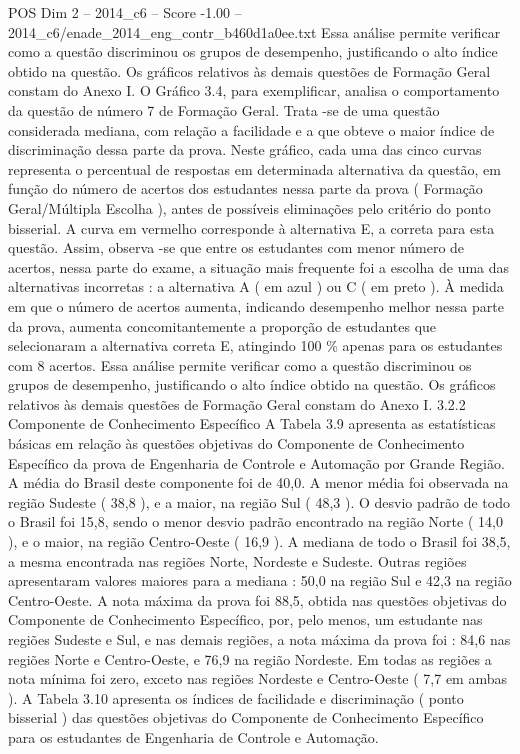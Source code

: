 \begin{textsample}{POS Dim 2 – 2014\_c6 – Score -1.00 – 2014\_c6/enade\_2014\_eng\_contr\_b460d1a0ee.txt}
Essa análise permite verificar como a questão discriminou os grupos de desempenho, justificando o alto índice obtido na questão.
Os gráficos relativos às demais questões de Formação Geral constam do Anexo I.
O Gráfico 3.4, para exemplificar, analisa o comportamento da questão de número 7 de Formação Geral.
Trata -se de uma questão considerada mediana, com relação a facilidade e a que obteve o maior índice de discriminação dessa parte da prova.
Neste gráfico, cada uma das cinco curvas representa o percentual de respostas em determinada alternativa da questão, em função do número de acertos dos estudantes nessa parte da prova ( Formação Geral/Múltipla Escolha ), antes de possíveis eliminações pelo critério do ponto bisserial.
A curva em vermelho corresponde à alternativa E, a correta para esta questão.
Assim, observa -se que entre os estudantes com menor número de acertos, nessa parte do exame, a situação mais frequente foi a escolha de uma das alternativas incorretas : a alternativa A ( em azul ) ou C ( em preto ).
À medida em que o número de acertos aumenta, indicando desempenho melhor nessa parte da prova, aumenta concomitantemente a proporção de estudantes que selecionaram a alternativa correta E, atingindo 100 \% apenas para os estudantes com 8 acertos.
Essa análise permite verificar como a questão discriminou os grupos de desempenho, justificando o alto índice obtido na questão.
Os gráficos relativos às demais questões de Formação Geral constam do Anexo I. 3.2.2 Componente de Conhecimento Específico A Tabela 3.9 apresenta as estatísticas básicas em relação às questões objetivas do Componente de Conhecimento Específico da prova de Engenharia de Controle e Automação por Grande Região.
A média do Brasil deste componente foi de 40,0.
A menor média foi observada na região Sudeste ( 38,8 ), e a maior, na região Sul ( 48,3 ).
O desvio padrão de todo o Brasil foi 15,8, sendo o menor desvio padrão encontrado na região Norte ( 14,0 ), e o maior, na região Centro-Oeste ( 16,9 ).
A mediana de todo o Brasil foi 38,5, a mesma encontrada nas regiões Norte, Nordeste e Sudeste.
Outras regiões apresentaram valores maiores para a mediana : 50,0 na região Sul e 42,3 na região Centro-Oeste.
A nota máxima da prova foi 88,5, obtida nas questões objetivas do Componente de Conhecimento Específico, por, pelo menos, um estudante nas regiões Sudeste e Sul, e nas demais regiões, a nota máxima da prova foi : 84,6 nas regiões Norte e Centro-Oeste, e 76,9 na região Nordeste.
Em todas as regiões a nota mínima foi zero, exceto nas regiões Nordeste e Centro-Oeste ( 7,7 em ambas ).
A Tabela 3.10 apresenta os índices de facilidade e discriminação ( ponto bisserial ) das questões objetivas do Componente de Conhecimento Específico para os estudantes de Engenharia de Controle e Automação.

\end{textsample}
